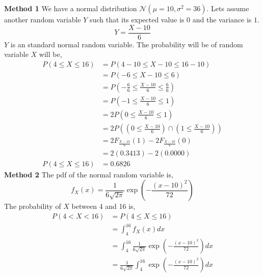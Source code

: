\documentclass[answers]{exam}
\begin{document}
\begin{questions}
    \begin{framed}
        \textbf{Method 1}\newline
        We have a normal distribution $\mathcal{N} (\mu=10,\sigma^2=36)$. Lets assume
        another random variable $Y$ such that its expected value is $0$ and the
        variance is $1$.
        \[Y=\frac{X-10}{6}\]
        $Y$ is an standard normal random variable. The probability will be of random
        variable $X$ will be,
        \begin{equation*}
            \begin{split}
                P\left(4\le X\le 16\right) & = P(4-10\le X-10\le 16-10)\\
                & = P\left(-6\le X-10\le 6\right)\\
                & = P\left(-\frac{6}{6}\le \frac{X-10}{6}\le \frac{6}{6}\right)\\
                & = P\left(-1\le \frac{X-10}{6}\le 1\right)\\
                & = 2P\left(0\le \frac{X-10}{6}\le 1\right)\\
                & = 2P\left(\left(0\le \frac{X-10}{6}\right)\cap\left(1\le \frac{X-10}{6}\right)\right)\\
                & = 2F_{\frac{X-10}{6}}(1)-2F_{\frac{X-10}{6}}(0)\\
                & = 2(0.3413)-2(0.0000)\\
                P\left(4\le X\le 16\right) & = 0.6826
            \end{split}
        \end{equation*}
        \newline\textbf{Method 2}\newline
        The pdf of the normal random variable is,
        \[f_{X}(x)=\frac{1}{6\sqrt{2\pi}}\exp\left(-\frac{(x-10)^2}{72}\right)\]
        The probability of $X$ between 4 and 16 is,
        \begin{equation*}
            \begin{split}
                P(4 < X < 16) & = P(4 \le X \le 16)\\
                & = \int_{4}^{16}f_{X}(x)dx\\
                & = \int_{4}^{16}\frac{1}{6\sqrt{2\pi}}\exp\left(-\frac{(x-10)^2}{72}\right)dx\\
                & = \frac{1}{6\sqrt{2\pi}}\int_{4}^{16}\exp\left(-\frac{(x-10)^2}{72}\right)dx\\

\end{split}
\end{equation*}
\end{framed}
\end{questions}
\end{document}
